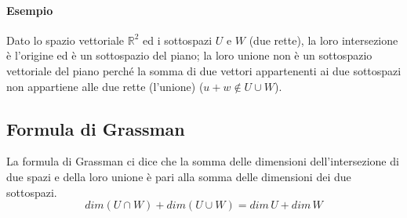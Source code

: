 			\paragraph{Esempio} Dato lo spazio vettoriale $\mathbb{R}^2$ ed i sottospazi $U$ e $W$ (due rette), la loro intersezione è l'origine ed è un sottospazio del piano; la loro unione non è un sottospazio vettoriale del piano perché la somma di due vettori appartenenti ai due sottospazi non appartiene alle due rette (l'unione) ($u + w \notin U \cup W $).
		\subsection{Formula di Grassman}
			La formula di Grassman ci dice che la somma delle dimensioni dell'intersezione di due spazi e della loro unione è pari alla somma delle dimensioni dei due sottospazi.
			$$ dim (U \cap W) + dim (U \cup W) = dim \, U + dim \, W$$	